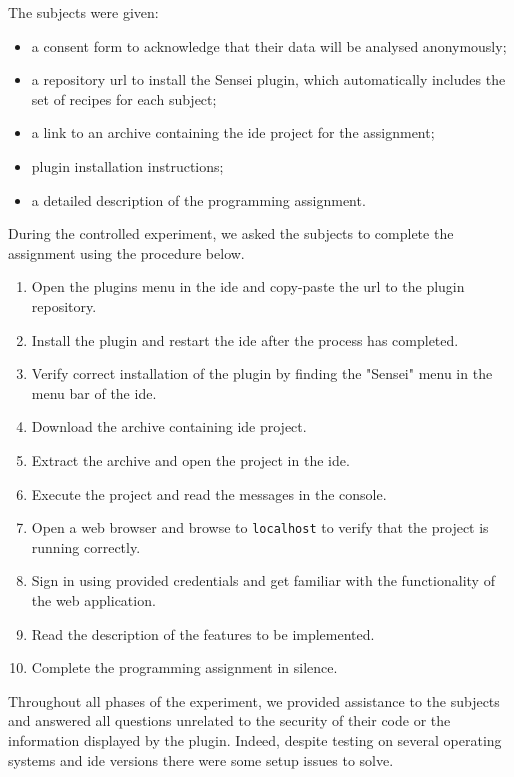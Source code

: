 The subjects were given:
\begin{itemize}[noitemsep]
    \item a consent form to acknowledge that their data will be analysed anonymously;
    \item a repository \gls{url} to install the Sensei plugin, which automatically includes the set of recipes for each subject;
    \item a link to an archive containing the \gls{ide} project for the assignment;
    \item plugin installation instructions;
    \item a detailed description of the programming assignment.
\end{itemize}

During the controlled experiment, we asked the subjects to complete the assignment using the procedure below.

\begin{enumerate}[noitemsep]
    \item Open the plugins menu in the \gls{ide} and copy-paste the \gls{url} to the plugin repository.
    \item Install the plugin and restart the \gls{ide} after the process has completed.
    \item Verify correct installation of the plugin by finding the "Sensei" menu in the menu bar of the \gls{ide}.
    \item Download the archive containing \gls{ide} project.
    \item Extract the archive and open the project in the \gls{ide}.
    \item Execute the project and read the messages in the console.
    \item Open a web browser and browse to \texttt{localhost} to verify that the project is running correctly.
    \item Sign in using provided credentials and get familiar with the functionality of the web application.
    \item Read the description of the features to be implemented.
    \item Complete the programming assignment in silence.
\end{enumerate}

Throughout all phases of the experiment, we provided assistance to the subjects and answered all questions unrelated to the security of their code or the information displayed by the plugin.
Indeed, despite testing on several operating systems and \gls{ide} versions there were some setup issues to solve.

